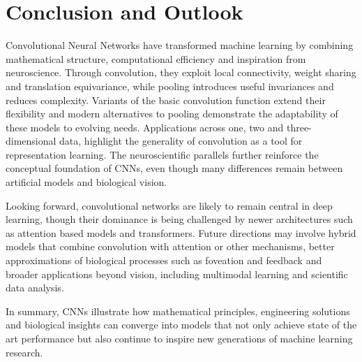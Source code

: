 \chapter{Conclusion and Outlook}

Convolutional Neural Networks have transformed machine learning by combining mathematical structure, computational efficiency and inspiration from neuroscience.  
Through convolution, they exploit local connectivity, weight sharing and translation equivariance, while pooling introduces useful invariances and reduces complexity.  
Variants of the basic convolution function extend their flexibility and modern alternatives to pooling demonstrate the adaptability of these models to evolving needs.  
Applications across one, two and three-dimensional data, highlight the generality of convolution as a tool for representation learning.  
The neuroscientific parallels further reinforce the conceptual foundation of CNNs, even though many differences remain between artificial models and biological vision.

Looking forward, convolutional networks are likely to remain central in deep learning, though their dominance is being challenged by newer architectures such as attention based models and transformers.  
Future directions may involve hybrid models that combine convolution with attention or other mechanisms, better approximations of biological processes such as foveation and feedback and broader applications beyond vision, including multimodal learning and scientific data analysis.  

In summary, CNNs illustrate how mathematical principles, engineering solutions and biological insights can converge into models that not only achieve state of the art performance but also continue to inspire new generations of machine learning research.
